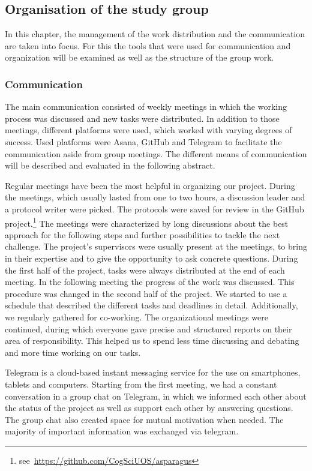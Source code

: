 \subsection{Organisation of the study group}
\label{sec:Organization}

In this chapter, the management of the work distribution and the communication are taken into focus. For this the tools that were used for communication and organization will be examined as well as the structure of the group work.


\subsubsection{Communication}
\label{subsec:Communication}

The main communication consisted of weekly meetings in which the working process was discussed and new tasks were distributed. In addition to those meetings, different platforms were used, which worked with varying degrees of success. Used platforms were Asana, GitHub and Telegram to facilitate the communication aside from group meetings. The different means of communication will be described and evaluated in the following abstract.

\bigskip
Regular meetings have been the most helpful in organizing our project. During the meetings, which usually lasted from one to two hours, a discussion leader and a protocol writer were picked. The protocols were saved for review in the GitHub project.\footnote{ see~\url{https://github.com/CogSciUOS/asparagus}} The meetings were characterized by long discussions about the best approach for the following steps and further possibilities to tackle the next challenge. The project’s supervisors were usually present at the meetings, to bring in their expertise and to give the opportunity to ask concrete questions. During the first half of the project, tasks were always distributed at the end of each meeting. In the following meeting the progress of the work was discussed. This procedure was changed in the second half of the project. We started to use a schedule that described the different tasks and deadlines in detail. Additionally, we regularly gathered for co-working. The organizational meetings were continued, during which everyone gave precise and structured reports on their area of responsibility. This helped us to spend less time discussing and debating and more time working on our tasks.

Telegram is a cloud-based instant messaging service for the use on smartphones, tablets and computers. Starting from the first meeting, we had a constant conversation in a group chat on Telegram, in which we informed each other about the status of the project as well as support each other by answering questions. The group chat also created space for mutual motivation when needed. The majority of important information was exchanged via telegram.

